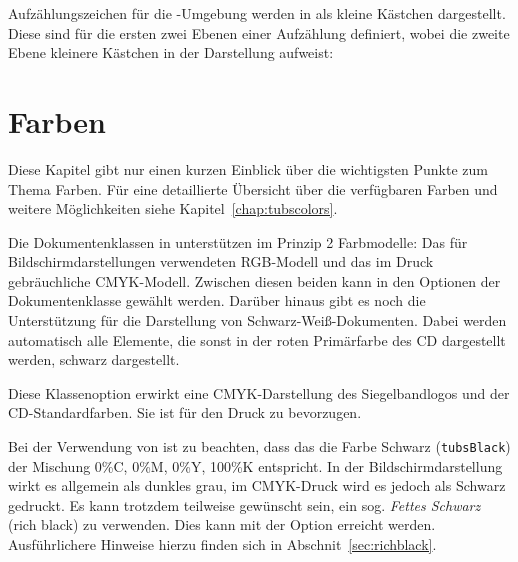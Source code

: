 Aufzählungszeichen für die -Umgebung werden in \tubslatex
als kleine Kästchen dargestellt.
Diese sind für die ersten zwei Ebenen einer Aufzählung definiert, wobei
die zweite Ebene kleinere Kästchen in der Darstellung aufweist:
\begin{center}
\end{center}



\section{Farben}

Diese Kapitel gibt nur einen kurzen Einblick über die wichtigsten Punkte
zum Thema Farben. Für eine detaillierte Übersicht über die verfügbaren Farben
und weitere Möglichkeiten siehe Kapitel~\ref{chap:tubscolors}.%

Die Dokumentenklassen in \tubslatex unterstützen im Prinzip 2 Farbmodelle:
Das für Bildschirmdarstellungen verwendeten RGB-Modell und das im
Druck gebräuchliche CMYK-Modell. Zwischen diesen beiden kann in den Optionen
der Dokumentenklasse gewählt werden. Darüber hinaus gibt es noch die Unterstützung
für die Darstellung von Schwarz-Weiß-Dokumenten. Dabei werden automatisch
alle Elemente, die sonst in der roten Primärfarbe des CD dargestellt werden,
schwarz dargestellt.

\begin{Declaration}
\end{Declaration}

Diese Klassenoption erwirkt eine CMYK-Darstellung des Siegelbandlogos und der
CD-Standardfarben. Sie ist für den Druck zu bevorzugen.

\begin{hint}
  Bei der Verwendung von  ist zu beachten,
  dass das die Farbe Schwarz (\texttt{tubsBlack})
  der Mischung 0\%C, 0\%M, 0\%Y, 100\%K entspricht.
  In der Bildschirmdarstellung wirkt es allgemein als dunkles grau,
  im CMYK-Druck wird es jedoch als Schwarz gedruckt.
  Es kann trotzdem teilweise gewünscht sein, ein sog. \emph{Fettes Schwarz}
  (rich black) zu verwenden.
  Dies kann mit der Option  erreicht werden.
  Ausführlichere Hinweise hierzu finden sich in Abschnit~\ref{sec:richblack}.
\end{hint}

